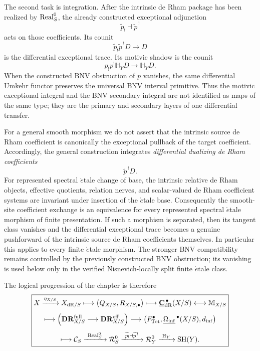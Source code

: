 The second task is integration.  After the intrinsic de Rham package has been
realized by \(\operatorname{Real}^{0}_S\), the already constructed exceptional adjunction
\[
    \widetilde p_!\dashv\widetilde p^{\,!}
\]
acts on those coefficients.  Its counit
\[
    \widetilde p_!\widetilde p^{\,!}D
    \longrightarrow
    D
\]
is the differential exceptional trace.  Its motivic shadow is the counit
\[
    p_!p^!\mathbb H_YD
    \longrightarrow
    \mathbb H_YD.
\]
When the constructed BNV obstruction of \(p\) vanishes, the same differential
Umkehr functor preserves the universal BNV interval primitive.  Thus the
motivic exceptional integral and the BNV secondary integral are not
identified as maps of the same type; they are the primary and secondary
layers of one differential transfer.

For a general smooth morphism we do not assert that the intrinsic source de
Rham coefficient is canonically the exceptional pullback of the target
coefficient.  Accordingly, the general construction integrates
\emph{differential dualizing de Rham coefficients}
\[
    \widetilde p^{\,!}D.
\]
For represented spectral \(\acute{e}\)tale change of base, the intrinsic
relative de Rham objects, effective quotients, relation nerves, and scalar-valued
de Rham coefficient systems are invariant under insertion of the
\(\acute{e}\)tale base.  Consequently the smooth-site coefficient exchange is
an equivalence for every represented spectral \(\acute{e}\)tale morphism of
finite presentation.  If such a morphism is separated, then its tangent class
vanishes and the differential exceptional trace becomes a genuine pushforward
of the intrinsic source de Rham coefficients themselves.  In particular this
applies to every finite \(\acute{e}\)tale morphism.  The stronger BNV
compatibility remains controlled by the previously constructed BNV obstruction;
its vanishing is used below only in the verified Nisnevich-locally split finite
\(\acute{e}\)tale class.

The logical progression of the chapter is therefore
\[
\boxed{
\begin{gathered}
X\xrightarrow{\eta_{X/S}}X_{\mathrm{dR}/S}
\longmapsto
\bigl(Q_{X/S},R_{X/S,\bullet}\bigr)
\longmapsto
\underline{\mathbf C}_{\mathrm{dR}}^{\,\bullet}(X/S)
\longleftrightarrow
\mathbb M_{X/S}
\\[4pt]
\longmapsto
\left(
    \mathbf{DR}^{\mathrm{full}}_{X/S}
    \longrightarrow
    \mathbf{DR}^{\mathrm{eff}}_{X/S}
\right)
\longmapsto
\bigl(
    F_{\mathrm{Tot}}^\bullet,
    \underline{\Omega_{\mathrm{inf}}}^{\,\bullet}(X/S),
    d_{\inf}
\bigr)
\\[4pt]
\longmapsto
\mathcal C_S
\xrightarrow{\ \operatorname{Real}^{0}_S\ }
\mathcal R_S^0
\xrightarrow{\ \widetilde p_!\dashv\widetilde p^{\,!}\ }
\mathcal R_Y^0
\xrightarrow{\ \mathbb H_Y\ }
\mathrm{SH}(Y).
\end{gathered}
}
\]

